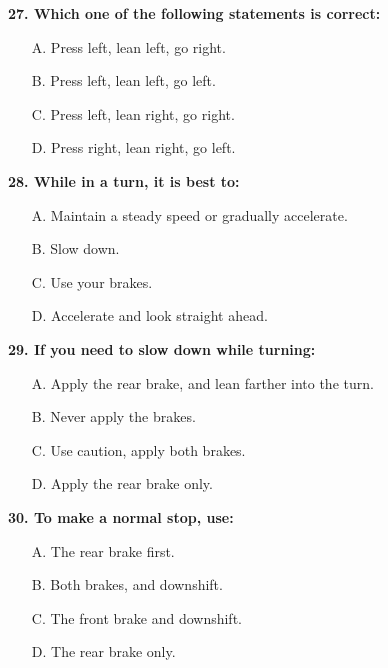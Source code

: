 \begin{minipage}{\linewidth}
\vspace{1em}\noindent\textbf{27. Which one of the following statements is correct:}

\begin{itemize}[nosep,leftmargin=2em]
\item [A.] Press left, lean left, go right.
\item [B.] Press left, lean left, go left.
\item [C.] Press left, lean right, go right.
\item [D.] Press right, lean right, go left.

\end{itemize}
\end{minipage}


\begin{minipage}{\linewidth}
\vspace{1em}\noindent\textbf{28. While in a turn, it is best to:}

\begin{itemize}[nosep,leftmargin=2em]
\item [A.] Maintain a steady speed or gradually accelerate.
\item [B.] Slow down.
\item [C.] Use your brakes.
\item [D.] Accelerate and look straight ahead.

\end{itemize}
\end{minipage}


\begin{minipage}{\linewidth}
\vspace{1em}\noindent\textbf{29. If you need to slow down while turning:}

\begin{itemize}[nosep,leftmargin=2em]
\item [A.] Apply the rear brake, and lean farther into the turn.
\item [B.] Never apply the brakes.
\item [C.] Use caution, apply both brakes.
\item [D.] Apply the rear brake only.

\end{itemize}
\end{minipage}


\begin{minipage}{\linewidth}
\vspace{1em}\noindent\textbf{30. To make a normal stop, use:}

\begin{itemize}[nosep,leftmargin=2em]
\item [A.] The rear brake first.
\item [B.] Both brakes, and downshift.
\item [C.] The front brake and downshift.
\item [D.] The rear brake only.

\end{itemize}
\end{minipage}


